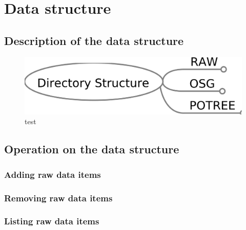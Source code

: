 \section{Data structure}
\label{sec:data_structure}

\subsection{Description of the data structure}
\begin{figure}
 \centering
 \includegraphics[]{fig/directory_structure_overview}
 \caption{test}
 \label{fig:directory_structure_overview}
\end{figure}

\subsection{Operation on the data structure}
\subsubsection{Adding raw data items}
\subsubsection{Removing raw data items}
\subsubsection{Listing raw data items}